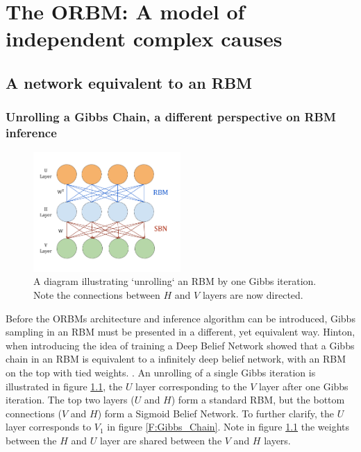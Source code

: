 
\chapter{The ORBM: A model of independent complex causes}

\section{A network equivalent to an RBM}

\subsection{Unrolling a Gibbs Chain, a different perspective on RBM inference}

\begin{figure}
  \begin{center}
    \includegraphics[width=0.5\textwidth]{Assets/3_Layer_RBM.png}
  \end{center}
  \caption{A diagram illustrating `unrolling` an RBM by one Gibbs iteration. Note the connections between $H$ and $V$ layers are now directed.}
  \label{F:3-Layer-RBM}
\end{figure}

Before the ORBMs architecture and inference algorithm can be introduced, Gibbs sampling in an RBM must be presented in a different, yet equivalent way.
Hinton, when introducing the idea of training a Deep Belief Network showed that a Gibbs chain in an RBM is equivalent to a infinitely deep belief network, with an RBM on the top with tied weights. . An unrolling of a single Gibbs iteration is illustrated in figure \ref{F:3-Layer-RBM}, the $U$ layer corresponding to the $V$ layer after one Gibbs iteration. The top two layers ($U$ and $H$) form a standard RBM, but the bottom connections ($V$ and $H$) form a Sigmoid Belief Network. To further clarify, the $U$ layer corresponds to $V_1$ in figure \ref{F:Gibbs_Chain}. Note in figure \ref{F:3-Layer-RBM} the weights  between the $H$ and $U$ layer are shared between the $V$ and $H$ layers.

